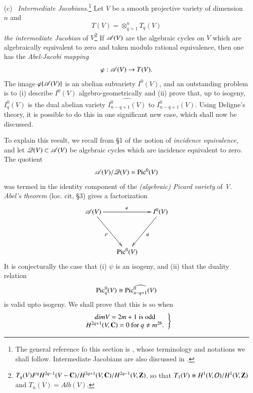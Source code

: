 \noindent
(c)~ \textit{Intermediate Jacobians.}\footnote[24]{The general reference fo this section is \cite{art4-key22}, whose terminology and notations we shall follow. Intermediate Jacobians are also discussed in \cite{art4-key36}.} Let $V$ be a smooth projective variety of dimension $n$ and
$$
T (V) = \otimes^n_{q=1} T_q (V)
$$
\textit{the intermediate Jacobian} of $V$\footnote[25]{$T_q (V) F^q H^{2q-1} (V-\mathbf{C}) / H^{2q+1} (V, \mathbf{C}) / H^{2q-1} (V, \mathbf{Z})$, so that $T_1 (V) \cong H^1 (V, \mathcal{O})/ H^1 (V,\mathbf{Z})$ and $T_{n}(V) = Alb (V)$.} If $\mathscr{A} (V)$ are the algebraic cycles on $V$ which are algebraically equivalent to zero and taken modulo rational equivalence, then one has the \textit{Abel-Jacobi mapping}
$$
\varphi : \mathscr{A} (V) \to T (V).
$$
The image $\varphi \{\mathscr{A} (V)\}$ is an abelian subvariety $I^0(V)$, and an outstanding problem is to (i) describe $I^0(V)$ algebro-geometrically and (ii) prove that, up to isogeny, $I^0_q (V)$ is the dual abelian variety $\widehat{I^0_{n-q+1} (V)}$ to $I^0_{n-q+1} (V)$. Using Deligne's theory, it is possible to do this in one significant new case, which shall now be discussed.

To explain this result, we recall from \S 1 of \cite{art4-22} the notion of \textit{incidence equivalence}, and let $\mathscr{Q} (V) \subset \mathscr{A} (V)$ be algebraic cycles which are incidence equivalent to zero. The quotient
$$
\mathscr{A} (V)/ \mathscr{Q} (V) = \operatorname{Pic}^0 (V)
$$
was termed in \cite{art4-key22} the identity component of the \textit{(algebraic) Picard variety} of \textit{V. Abel's theorem} (loc. cit, \S 3) gives a factorization
\setcounter{equation}{6}
\begin{equation}
\vcenter{
\xymatrix@R=1.5cm@C=.6cm{ 
\sA(V) \ar[rr]^\varphi \ar[dr]_-{\rho} && I^{0}(V) \ar[dl]^-{\psi}\\
& \Pic^0(V) &}}\label{art4-eq6.7}
\end{equation}
It is conjecturally the case that (i) $\psi$ is an isogeny, and (ii) that the duality relation
\setcounter{equation}{7}
\begin{equation}\label{art4-eq6.8}
\operatorname{Pic}^0_q (V) \cong \widehat{\operatorname{Pic}^0_{n-q+1} (V)}
\end{equation}
is valid upto isogeny. We shall prove that this is so when
\begin{equation}
\left.
\begin{array}{c}
dim V = 2 m +1 \text{ is odd}\\
H^{2q+1} (V, \bC) = 0 \text{ for } q \neq m\footnotemark[26]{} .
\end{array}
\right\}\label{art4-eq6.9}
\end{equation}\pageoriginale

